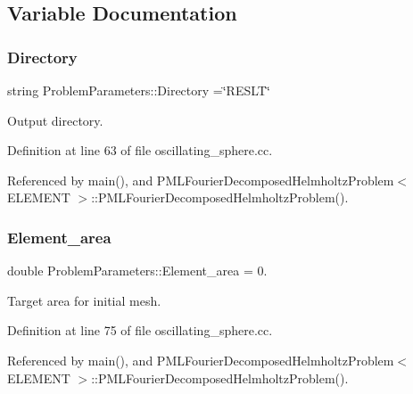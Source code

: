 \subsection{Variable Documentation}
\mbox{\label{namespaceProblemParameters_a9df0f1728e8e7e53dcca84385ae9a031}} 
\subsubsection{\texorpdfstring{Directory}{Directory}}
{\footnotesize\ttfamily string Problem\+Parameters\+::\+Directory =\char`\"{}R\+E\+S\+LT\char`\"{}}



Output directory. 



Definition at line 63 of file oscillating\+\_\+sphere.\+cc.



Referenced by main(), and P\+M\+L\+Fourier\+Decomposed\+Helmholtz\+Problem$<$ E\+L\+E\+M\+E\+N\+T $>$\+::\+P\+M\+L\+Fourier\+Decomposed\+Helmholtz\+Problem().

\mbox{\label{namespaceProblemParameters_aafe26abadfce87800a6a4676f0476956}} 
\subsubsection{\texorpdfstring{Element\+\_\+area}{Element\_area}}
{\footnotesize\ttfamily double Problem\+Parameters\+::\+Element\+\_\+area = 0.}



Target area for initial mesh. 



Definition at line 75 of file oscillating\+\_\+sphere.\+cc.



Referenced by main(), and P\+M\+L\+Fourier\+Decomposed\+Helmholtz\+Problem$<$ E\+L\+E\+M\+E\+N\+T $>$\+::\+P\+M\+L\+Fourier\+Decomposed\+Helmholtz\+Problem().

\mbox{\label{namespaceProblemParameters_aa5362de1af9e257fde4317c367158a93}} 
